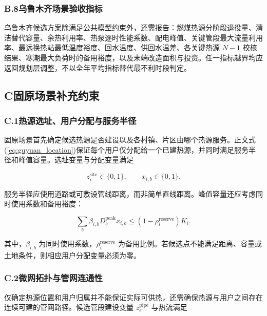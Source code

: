 \subsubsection*{B.8\quad 乌鲁木齐场景验收指标}

乌鲁木齐候选方案除满足公共模型约束外，还需报告：燃煤热源分阶段退役量、清洁替代容量、余热利用率、热泵逐时性能系数、配电峰值、关键管段最大流量利用率、最远换热站最低温度裕度、回水温度、供回水温差、各关键热源 $N-1$ 校核结果、寒潮最大负荷时的备用裕度，以及末端改造面积与投资。任一指标越界均应返回规划层调整，不以全年平均指标替代最不利时段判定。

\clearpage

\subsection*{C\quad 固原场景补充约束}
\label{app:guyuan}

\subsubsection*{C.1\quad 热源选址、用户分配与服务半径}

固原场景首先确定候选热源是否建设以及各村镇、片区由哪个热源服务。正文式(\ref{eq:guyuan_location})保证每个用户仅分配给一个已建热源，并同时满足服务半径和峰值容量。选址变量与分配变量满足

\begin{equation}
z_i^{\mathrm{site}}\in\{0,1\},
\qquad
x_{i,b}\in\{0,1\}.
\label{eq:guyuan_binary}
\end{equation}

服务半径应使用道路或可敷设管线距离，而非简单直线距离。峰值容量还应考虑同时使用系数和备用裕度：

\begin{equation}
\sum_b\beta_{i,b}D_b^{\mathrm{peak}}x_{i,b}
\leq (1-\rho_i^{\mathrm{reserve}})K_i.
\label{eq:guyuan_peak_capacity}
\end{equation}

其中，$\beta_{i,b}$ 为同时使用系数，$\rho_i^{\mathrm{reserve}}$ 为备用比例。若候选点不能满足距离、容量或土地条件，则相应用户分配变量必须为零。

\subsubsection*{C.2\quad 微网拓扑与管网连通性}

仅确定热源位置和用户归属并不能保证实际可供热，还需确保热源与用户之间存在连续可建的管网路径。候选管段建设变量 $z_e^{\mathrm{pipe}}$ 与热流满足

